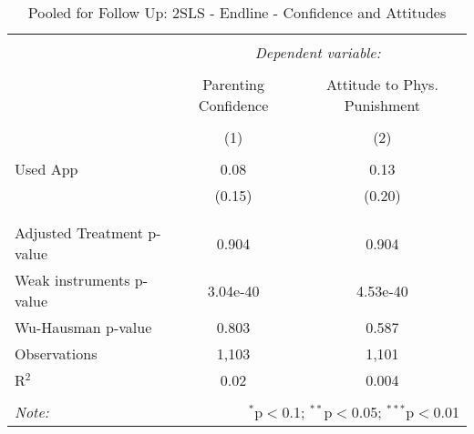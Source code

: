 
\begin{table}[!htbp] \centering 
  \caption{Pooled for Follow Up: 2SLS - Endline - Confidence and Attitudes} 
  \label{tbl:Pooled for Follow Up: 2SLS - Endline - Confidence and Attitudes} 
\begin{tabular}{@{\extracolsep{5pt}}lcc} 
\\[-1.8ex]\hline 
\hline \\[-1.8ex] 
 & \multicolumn{2}{c}{\textit{Dependent variable:}} \\ 
\cline{2-3} 
\\[-1.8ex] & Parenting Confidence & Attitude to Phys. Punishment \\ 
\\[-1.8ex] & (1) & (2)\\ 
\hline \\[-1.8ex] 
 Used App & 0.08 & 0.13 \\ 
  & (0.15) & (0.20) \\ 
  & & \\ 
\hline \\[-1.8ex] 
Adjusted Treatment p-value & 0.904 & 0.904 \\ 
Weak instruments p-value & 3.04e-40 & 4.53e-40 \\ 
Wu-Hausman p-value & 0.803 & 0.587 \\ 
Observations & 1,103 & 1,101 \\ 
R$^{2}$ & 0.02 & 0.004 \\ 
\hline 
\hline \\[-1.8ex] 
\textit{Note:}  & \multicolumn{2}{r}{$^{*}$p$<$0.1; $^{**}$p$<$0.05; $^{***}$p$<$0.01} \\ 
\end{tabular} 
\end{table} 
